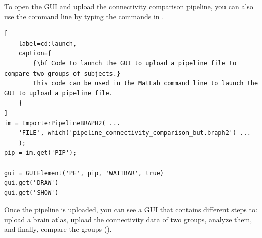 \documentclass[justified]{tufte-handout}
\begin{document}

\begin{tcolorbox}[
	title=Pipeline launch from command line
]
To open the GUI and upload the connectivity comparison pipeline, you can also use the command line by typing the commands in .

\begin{lstlisting}[
	label=cd:launch,
	caption={
		{\bf Code to launch the GUI to upload a pipeline file to compare two groups of subjects.}
		This code can be used in the MatLab command line to launch the GUI to upload a pipeline file.
	}
]
im = ImporterPipelineBRAPH2( ...
	'FILE', which('pipeline_connectivity_comparison_but.braph2') ...
	);
pip = im.get('PIP');

gui = GUIElement('PE', pip, 'WAITBAR', true)
gui.get('DRAW')
gui.get('SHOW')
\end{lstlisting}
\end{tcolorbox}

Once the pipeline is uploaded, you can see a GUI that contains different steps to: upload a brain atlas, upload the connectivity data of two groups, analyze them, and finally, compare the groups (). 
\end{document}
